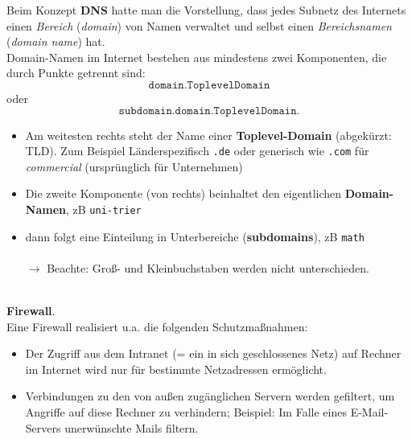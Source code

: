 Beim Konzept \textbf{DNS} hatte man die Vorstellung, dass jedes Subnetz des Internets einen \textit{Bereich} (\textit{domain}) von Namen verwaltet und selbst einen \textit{Bereichsnamen} (\textit{domain name}) hat.
~\\
Domain-Namen im Internet bestehen aus mindestens zwei Komponenten, die durch Punkte getrennt sind:
$$\texttt{domain.ToplevelDomain}$$
oder
$$\texttt{subdomain.domain.ToplevelDomain}.$$
\begin{itemize}
	\item Am weitesten rechts steht der Name einer \textbf{Toplevel-Domain} (abgekürzt: TLD). Zum Beispiel Länderspezifisch \texttt{.de} oder generisch wie \texttt{.com} für \textit{commercial} (ursprünglich für Unternehmen)
	\item  Die zweite Komponente (von rechts) beinhaltet den eigentlichen \textbf{Domain-Namen}, zB \texttt{uni-trier}
	\item dann folgt eine Einteilung in Unterbereiche (\textbf{subdomains}), zB \texttt{math}\\~\\
	$\to$ Beachte: Groß- und Kleinbuchstaben werden nicht unterschieden.
\end{itemize}


~\\
\textbf{Firewall}. \\
Eine Firewall realisiert u.a. die folgenden Schutzmaßnahmen:
\begin{itemize}
	\item Der Zugriff aus dem Intranet (= ein in sich geschlossenes Netz) auf Rechner im Internet wird nur für bestimmte Netzadressen ermöglicht.
	\item Verbindungen zu den von außen zugänglichen Servern werden gefiltert, um Angriffe auf diese Rechner zu verhindern; Beispiel: Im Falle eines E-Mail-Servers unerwünschte Mails filtern.
\end{itemize}



